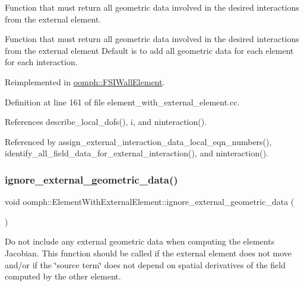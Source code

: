 Function that must return all geometric data involved in the desired interactions from the external element. 

Function that must return all geometric data involved in the desired interactions from the external element Default is to add all geometric data for each element for each interaction. 

Reimplemented in \hyperlink{classoomph_1_1FSIWallElement_ab8c98231f65ff11da582bf58ab1910fe}{oomph\+::\+F\+S\+I\+Wall\+Element}.



Definition at line 161 of file element\+\_\+with\+\_\+external\+\_\+element.\+cc.



References describe\+\_\+local\+\_\+dofs(), i, and ninteraction().



Referenced by assign\+\_\+external\+\_\+interaction\+\_\+data\+\_\+local\+\_\+eqn\+\_\+numbers(), identify\+\_\+all\+\_\+field\+\_\+data\+\_\+for\+\_\+external\+\_\+interaction(), and ninteraction().

\mbox{\label{classoomph_1_1ElementWithExternalElement_ad491ce37b07b2e15a95bb450409eb2b6}} 
\subsubsection{\texorpdfstring{ignore\+\_\+external\+\_\+geometric\+\_\+data()}{ignore\_external\_geometric\_data()}}
{\footnotesize\ttfamily void oomph\+::\+Element\+With\+External\+Element\+::ignore\+\_\+external\+\_\+geometric\+\_\+data (\begin{DoxyParamCaption}{ }\end{DoxyParamCaption})\hspace{0.3cm}{\ttfamily [inline]}}



Do not include any external geometric data when computing the element\textquotesingle{}s Jacobian. This function should be called if the external element does not move and/or if the \char`\"{}source term\char`\"{} does not depend on spatial derivatives of the field computed by the other element. 




